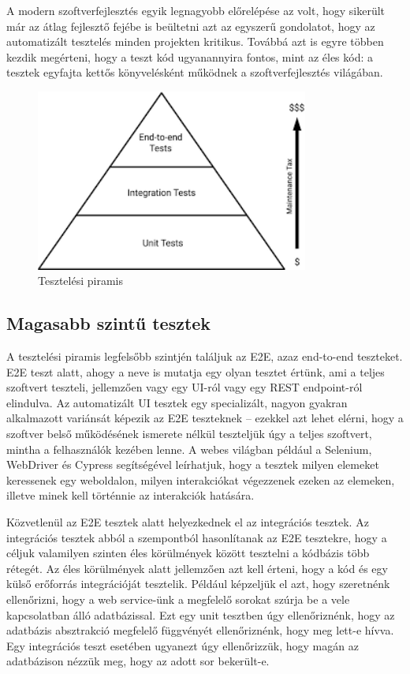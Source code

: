 A modern szoftverfejlesztés egyik legnagyobb előrelépése az volt, hogy sikerült már az átlag fejlesztő fejébe is beültetni azt az egyszerű gondolatot, hogy az automatizált tesztelés minden projekten kritikus. Továbbá azt is egyre többen kezdik megérteni, hogy a teszt kód ugyanannyira fontos, mint az éles kód: a tesztek egyfajta kettős könyvelésként működnek a szoftverfejlesztés világában.

\begin{figure}[H]
    \centering
    \includegraphics[width=0.8\textwidth]{images/piramis.png}
    \caption{Tesztelési piramis}
    \label{fig:testing-pyramid}
\end{figure}

\subsection{Magasabb szintű tesztek}

A tesztelési piramis legfelsőbb szintjén találjuk az E2E, azaz end-to-end teszteket. E2E teszt alatt, ahogy a neve is mutatja egy olyan tesztet értünk, ami a teljes szoftvert teszteli, jellemzően vagy egy UI-ról vagy egy REST endpoint-ról elindulva. Az automatizált UI tesztek egy specializált, nagyon gyakran alkalmazott variánsát képezik az E2E teszteknek -- ezekkel azt lehet elérni, hogy a szoftver belső működésének ismerete nélkül teszteljük úgy a teljes szoftvert, mintha a felhasználók kezében lenne.
A webes világban például a Selenium, WebDriver és Cypress segítségével leírhatjuk, hogy a tesztek milyen elemeket keressenek egy weboldalon, milyen interakciókat végezzenek ezeken az elemeken, illetve minek kell történnie az interakciók hatására.

Közvetlenül az E2E tesztek alatt helyezkednek el az integrációs tesztek. Az integrációs tesztek abból a szempontból hasonlítanak az E2E tesztekre, hogy a céljuk valamilyen szinten éles körülmények között tesztelni a kódbázis több rétegét. Az éles körülmények alatt jellemzően azt kell érteni, hogy a kód és egy külső erőforrás integrációját tesztelik.
Például képzeljük el azt, hogy szeretnénk ellenőrizni, hogy a web service-ünk a megfelelő sorokat szúrja be a vele kapcsolatban álló adatbázissal. Ezt egy unit tesztben úgy ellenőriznénk, hogy az adatbázis absztrakció megfelelő függvényét ellenőriznénk, hogy meg lett-e hívva. Egy integrációs teszt esetében ugyanezt úgy ellenőrizzük, hogy magán az adatbázison nézzük meg, hogy az adott sor bekerült-e.

